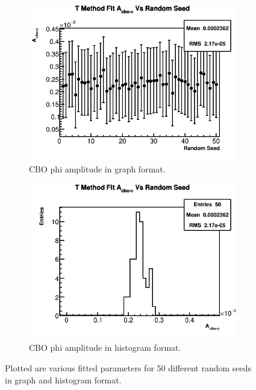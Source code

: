 \begin{figure}[]
	   	\begin{subfigure}[t]{0.45\textwidth}
		    \centering
			\includegraphics[width=\textwidth]{TMethod_A_cbo-phi_Vs_Iter_Canv}
		    \caption{CBO phi amplitude in graph format.}
	    \end{subfigure}
	    \hspace{4mm}
	    \begin{subfigure}[t]{0.45\textwidth}
		    \centering
			\includegraphics[width=\textwidth]{TMethod_A_cbo-phi_Vs_Iter_Canv_hist}
		    \caption{CBO phi amplitude in histogram format.}
	    \end{subfigure}%
	\caption[TMethodRandomSeedsPars5]{Plotted are various fitted parameters for 50 different random seeds in graph and histogram format.}
	\label{fig:TMethodRandomSeedsPars5}
	\end{figure}

